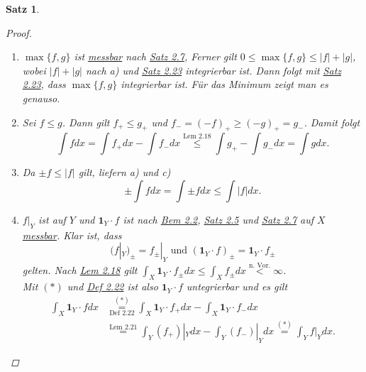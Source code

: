 \documentclass[a4paper]{report}
\newcommand{\doubleOne}{\textbf{1}}
\newcommand{\jshortlink}[1]{\jhyperref{#1}{\text{#1}}}
\newcommand{\jhyperref}[2]{\hyperref[j_#1]{#2}}
\newcommand{\jlink}[1]{\jhyperref{#1}{#1}}
\theoremstyle{plain}
\newtheorem{satz}[thm]{Satz}
\theoremstyle{definition}
\begin{document}
{{{{\begin{satz}
\begin{proof}
\begin{enumerate}
            \item
                $\max\{f,g\}$ ist \jlink{messbar} nach \jlink{Satz 2.7}, Ferner gilt $0\le \max\{f,g\}\le |f|+|g|$, wobei $|f|+|g|$ nach a) und \jlink{Satz 2.23} integrierbar ist. Dann folgt mit \jlink{Satz 2.23}, dass $\max\{f,g\}$ integrierbar ist. Für das Minimum zeigt man es genauso.
                
            \item
                Sei $f\le g$. Dann gilt $f_+\le g_+$ und $f_- = (-f)_+ \ge (-g)_+ = g_-$. Damit folgt
                \begin{displaymath}
                    \int f dx = \int f_+ dx - \int f_- dx \overset{\jshortlink{Lem 2.18}}{\le} \int g_+ - \int g_- dx = \int g dx.
                \end{displaymath}
            
            \item
                Da $\pm f\le |f|$ gilt, liefern a) und c)
                \begin{displaymath}
                    \pm \int f dx = \int \pm f dx \le \int |f| dx.
                \end{displaymath}

            \item
                $f|_Y$ ist auf $Y$ und $\doubleOne_Y\cdot f$ ist nach \jlink{Bem 2.2}, \jlink{Satz 2.5} und \jlink{Satz 2.7} auf $X$ \jlink{messbar}. Klar ist, dass 
                \begin{displaymath}
                    \tag{$*$}
                    (f|_Y)_\pm = f_\pm|_Y \text{ und } (\doubleOne_Y\cdot f)_\pm = \doubleOne_Y\cdot f_\pm
                \end{displaymath}
                gelten. Nach \jlink{Lem 2.18} gilt $\int_X \doubleOne_Y \cdot f_\pm dx \le \int_X f_\pm dx \overset{\text{n. Vor.}}{<} \infty$.\\
                Mit $(*)$ und \jlink{Def 2.22} ist also $\doubleOne_Y\cdot f$ untegrierbar und es gilt
                \begin{displaymath}
                    \begin{split}
                        \int_X \doubleOne_Y\cdot f dx &\overset{(*)}{\underset{\jshortlink{Def 2.22}}{=}} \int_X \doubleOne_Y \cdot f_+ dx - \int_X \doubleOne_Y \cdot f_- dx\\
                        &\overset{\jshortlink{Lem 2.21}}{=} \int_Y (f_+)|_Y dx -\int_Y (f_-)|_Y dx \overset{(*)}{=} \int_Y f|_Y dx.
                    \end{split}
                \end{displaymath}
            

\end{enumerate}
\end{proof}
\end{satz}}}}}
\end{document}

